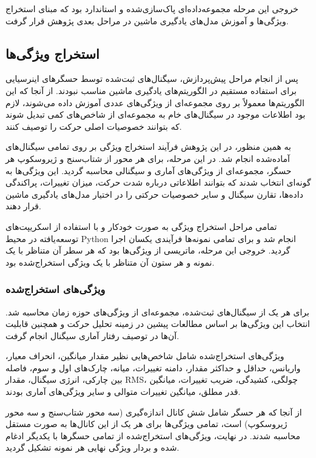 خروجی این مرحله مجموعه‌داده‌ای پاک‌سازی‌شده و استاندارد بود که مبنای استخراج ویژگی‌ها و آموزش مدل‌های یادگیری ماشین در مراحل بعدی پژوهش قرار گرفت.



\subsection{استخراج ویژگی‌ها}

پس از انجام مراحل پیش‌پردازش، سیگنال‌های ثبت‌شده توسط حسگرهای اینرسیایی برای استفاده مستقیم در الگوریتم‌های یادگیری ماشین مناسب نبودند. از آنجا که این الگوریتم‌ها معمولاً بر روی مجموعه‌ای از ویژگی‌های عددی آموزش داده می‌شوند، لازم بود اطلاعات موجود در سیگنال‌های خام به مجموعه‌ای از شاخص‌های کمی تبدیل شوند که بتوانند خصوصیات اصلی حرکت را توصیف کنند.

به همین منظور، در این پژوهش فرآیند استخراج ویژگی بر روی تمامی سیگنال‌های آماده‌شده انجام شد. در این مرحله، برای هر محور از شتاب‌سنج و ژیروسکوپ هر حسگر، مجموعه‌ای از ویژگی‌های آماری و سیگنالی محاسبه گردید. این ویژگی‌ها به گونه‌ای انتخاب شدند که بتوانند اطلاعاتی درباره شدت حرکت، میزان تغییرات، پراکندگی داده‌ها، تقارن سیگنال و سایر خصوصیات حرکتی را در اختیار مدل‌های یادگیری ماشین قرار دهند.

تمامی مراحل استخراج ویژگی به صورت خودکار و با استفاده از اسکریپت‌های توسعه‌یافته در محیط Python انجام شد و برای تمامی نمونه‌ها فرآیندی یکسان اجرا گردید. خروجی این مرحله، ماتریسی از ویژگی‌ها بود که هر سطر آن متناظر با یک نمونه و هر ستون آن متناظر با یک ویژگی استخراج‌شده بود.


\subsubsection{ویژگی‌های استخراج‌شده}

برای هر یک از سیگنال‌های ثبت‌شده، مجموعه‌ای از ویژگی‌های حوزه زمان محاسبه شد. انتخاب این ویژگی‌ها بر اساس مطالعات پیشین در زمینه تحلیل حرکت و همچنین قابلیت آن‌ها در توصیف رفتار آماری سیگنال انجام گرفت.

ویژگی‌های استخراج‌شده شامل شاخص‌هایی نظیر مقدار میانگین، انحراف معیار، واریانس، حداقل و حداکثر مقدار، دامنه تغییرات، میانه، چارک‌های اول و سوم، فاصله بین چارکی، انرژی سیگنال، مقدار RMS، چولگی، کشیدگی، ضریب تغییرات، میانگین قدر مطلق، میانگین تغییرات متوالی و سایر ویژگی‌های آماری بودند.

از آنجا که هر حسگر شامل شش کانال اندازه‌گیری (سه محور شتاب‌سنج و سه محور ژیروسکوپ) است، تمامی ویژگی‌ها برای هر یک از این کانال‌ها به صورت مستقل محاسبه شدند. در نهایت، ویژگی‌های استخراج‌شده از تمامی حسگرها با یکدیگر ادغام شده و بردار ویژگی نهایی هر نمونه تشکیل گردید.


